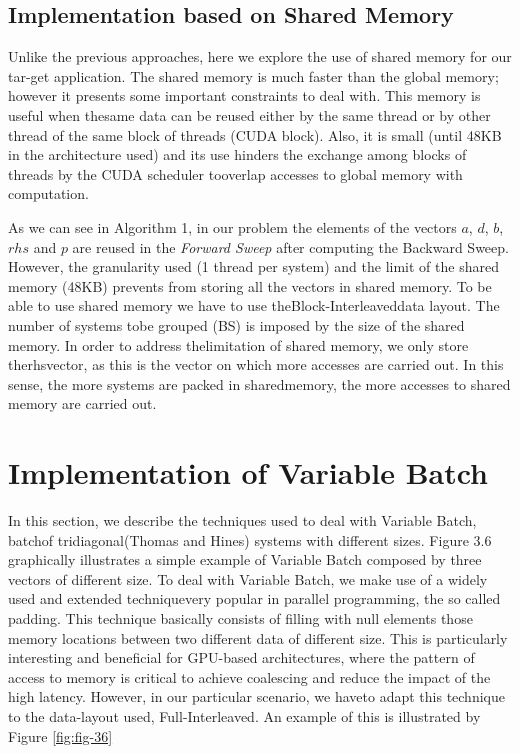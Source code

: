 \subsection*{Implementation based on Shared Memory}
Unlike the previous approaches, here we explore the use of shared
 memory for our tar-get application.  
 The shared memory is much faster than the global memory; 
 however it presents some important constraints to deal with. 
  This memory is useful when thesame  data  can  be  reused  either 
   by  the  same  thread  or  by  other  thread  of  the  same block 
   of threads (CUDA block).  Also, it is small (until 48KB in the 
    architecture used) and its use hinders the exchange among blocks
    of threads by the CUDA scheduler tooverlap accesses to global memory
     with computation.

 As we can see in Algorithm 1, in our problem the elements of the
vectors $a$, $d$, $b$, $rhs$ and $p$ are reused in the \textit{Forward 
 Sweep} after computing the Backward Sweep. However, the granularity used 
 (1 thread per system) and the limit of the shared memory (48KB) prevents
  from storing all the vectors in shared memory. To be able to use 
  shared memory we have to use theBlock-Interleaveddata layout.  
  The number of systems tobe grouped (BS) is imposed by the size of
   the shared memory.  In order to address thelimitation of shared 
   memory, we only store therhsvector, as this is the vector on which 
   more accesses are carried out.  In this sense,  the more systems 
   are packed in sharedmemory, the more accesses to shared memory 
   are carried out.


\vspace{10ex}
\section{Implementation of Variable Batch}

In  this  section,  we  describe  the  techniques  used  to  deal
with  Variable  Batch,  batchof tridiagonal(Thomas and Hines) 
systems with different sizes.  Figure 3.6 graphically illustrates a 
simple example of Variable Batch composed by three vectors of 
different size.  To deal with Variable Batch, we make use of a 
widely used and extended techniquevery popular in parallel
programming, the so called padding.  This technique basically consists
of  filling  with  null  elements  those  memory  locations  between  two  different data
of  different  size.   This  is  particularly  interesting  and  
beneficial  for  GPU-based architectures, where the pattern of 
access to memory is critical to achieve coalescing and reduce the 
impact of the high latency.  However, in our particular scenario, 
we haveto adapt this technique to the data-layout used, 
Full-Interleaved.  An example of this is illustrated by Figure \ref{fig:fig-36}

